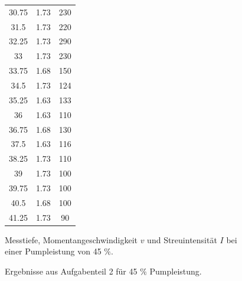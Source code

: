 \begin{figure}
\begin{subtable}{0.4\textwidth}
\begin{tabular}{c c c}
            30.75 &  1.73 & 230 \\
            31.5 & 1.73 & 220 \\
            32.25 & 1.73 & 290 \\
            33 & 1.73 & 230 \\
            33.75 &  1.68 & 150 \\
            34.5 & 1.73 & 124 \\
            35.25 & 1.63 & 133 \\
            36 & 1.63 & 110 \\
            36.75 & 1.68 & 130 \\
            37.5 & 1.63 & 116 \\
            38.25 & 1.73 & 110 \\
            39 & 1.73 & 100 \\
            39.75 & 1.73 & 100 \\
            40.5 & 1.68 & 100 \\
            41.25 & 1.73 & 90 \\
            \bottomrule
        \end{tabular}
        \caption{Messtiefe, Momentangeschwindigkeit $v$ und Streuintensität $I$ bei einer
        Pumpleistung von 45 $\%$.}
        \label{tab:5}
        \qquad
      \end{subtable}
      \caption{Ergebnisse aus Aufgabenteil 2 für 45 $\%$ Pumpleistung.}
    \end{figure}

